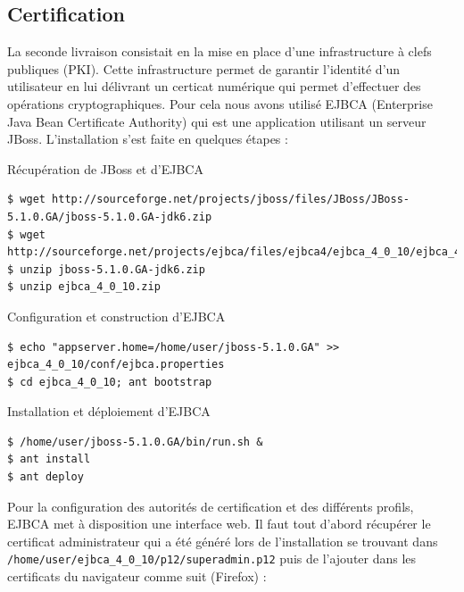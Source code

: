 \documentclass[a4paper,11pt,french]{book}
\begin{document}
\subsection{Certification}
La seconde livraison consistait en la mise en place d'une infrastructure à clefs publiques (PKI). Cette infrastructure permet de garantir l'identité d'un utilisateur en lui délivrant un certicat numérique qui permet d'effectuer des opérations cryptographiques. Pour cela nous avons utilisé EJBCA (Enterprise Java Bean Certificate Authority) qui est une application utilisant un serveur JBoss. L'installation s'est faite en quelques étapes :

\begin{paragraph}{Récupération de JBoss et d'EJBCA}
\small{
\begin{verbatim}
$ wget http://sourceforge.net/projects/jboss/files/JBoss/JBoss-5.1.0.GA/jboss-5.1.0.GA-jdk6.zip
$ wget http://sourceforge.net/projects/ejbca/files/ejbca4/ejbca_4_0_10/ejbca_4_0_10.zip
$ unzip jboss-5.1.0.GA-jdk6.zip
$ unzip ejbca_4_0_10.zip
\end{verbatim}
}
\end{paragraph}

\begin{paragraph}{Configuration et construction d'EJBCA}
\small{
\begin{verbatim}
$ echo "appserver.home=/home/user/jboss-5.1.0.GA" >> ejbca_4_0_10/conf/ejbca.properties
$ cd ejbca_4_0_10; ant bootstrap 
\end{verbatim}
}
\end{paragraph}

\begin{paragraph}{Installation et déploiement d'EJBCA}
\small{
\begin{verbatim}
$ /home/user/jboss-5.1.0.GA/bin/run.sh &
$ ant install
$ ant deploy
\end{verbatim}
}
\end{paragraph}
\newpage

Pour la configuration des autorités de certification et des différents profils, EJBCA met à disposition une interface web. Il faut tout d'abord récupérer le certificat administrateur qui a été généré lors de l'installation se trouvant dans \verb+/home/user/ejbca_4_0_10/p12/superadmin.p12+ puis de l'ajouter dans les certificats du navigateur comme suit (Firefox) :
\end{document}
